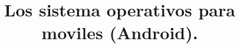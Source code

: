\documentclass{bmcart}
\begin{document}
\begin{frontmatter}

\begin{fmbox}


\title{Los sistema operativos para moviles (Android).}










\end{fmbox}%



\end{frontmatter}
\end{document}
